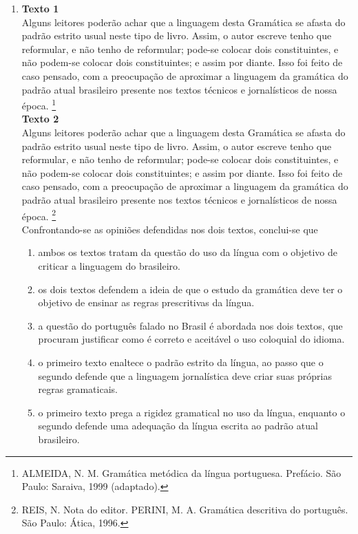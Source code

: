 \documentclass[10pt,a4paper]{article}
\begin{document}
\begin{multicols}{2}
\begin{enumerate}
	\item \textbf{Texto 1}\\
		Alguns leitores poder\~ao achar que a linguagem desta Gram\'atica se afasta do padr\~ao estrito usual neste tipo de livro. Assim, o autor escreve tenho que reformular, e n\~ao tenho de reformular; pode-se colocar dois constituintes, e n\~ao podem-se colocar dois constituintes; e assim por diante. Isso foi feito de caso pensado, com a preocupa\c{c}\~ao de aproximar a linguagem da gram\'atica do padr\~ao atual brasileiro presente nos textos t\'ecnicos e jornal\'isticos de nossa \'epoca.
	\footnote{ALMEIDA, N. M. Gram\'atica met\'odica da l\'ingua portuguesa. Pref\'acio. S\~ao Paulo: Saraiva, 1999 (adaptado).} \\
	\textbf{ Texto 2} \\
	Alguns leitores poder\~ao achar que a linguagem desta Gram\'atica se afasta do padr\~ao estrito usual neste tipo de livro. Assim, o autor escreve tenho que reformular, e n\~ao tenho de reformular; pode-se colocar dois constituintes, e n\~ao podem-se colocar dois constituintes; e assim por diante. Isso foi feito de caso pensado, com a preocupa\c{c}\~ao de aproximar a linguagem da gram\'atica do padr\~ao atual brasileiro presente nos textos t\'ecnicos e jornal\'isticos de nossa \'epoca.
	\footnote{REIS, N. Nota do editor. PERINI, M. A. Gram\'atica descritiva do portugu\^es. S\~ao Paulo: \'Atica, 1996.}\\
	Confrontando-se as opini\~oes defendidas nos dois textos, conclui-se que
		\begin{enumerate}
		\item ambos os textos tratam da quest\~ao do uso da l\'ingua com o objetivo de criticar a linguagem do brasileiro.
		\item os dois textos defendem a ideia de que o estudo da gram\'atica deve ter o objetivo de ensinar as regras prescritivas da l\'ingua.
		\item a quest\~ao do portugu\^es falado no Brasil \'e abordada nos dois textos, que procuram justificar como \'e correto e aceit\'avel o uso coloquial do idioma.
		\item o primeiro texto enaltece o padr\~ao estrito da l\'ingua, ao passo que o segundo defende que a linguagem jornal\'istica deve criar suas pr\'oprias regras gramaticais.
		\item o primeiro texto prega a rigidez gramatical no uso da l\'ingua, enquanto o segundo defende uma adequa\c{c}\~ao da l\'ingua escrita ao padr\~ao atual brasileiro.
		\end{enumerate}


\end{enumerate}
\end{multicols}
\end{document}
